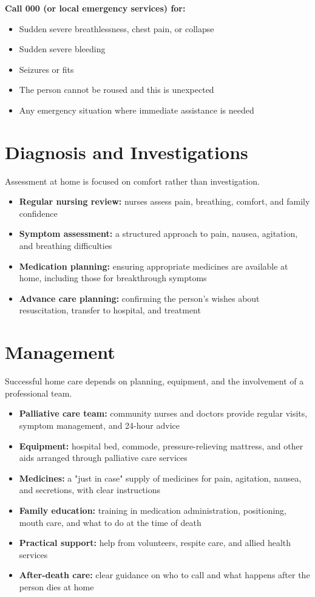 \textbf{Call 000 (or local emergency services) for:}
\begin{itemize}
    \item Sudden severe breathlessness, chest pain, or collapse
    \item Sudden severe bleeding
    \item Seizures or fits
    \item The person cannot be roused and this is unexpected
    \item Any emergency situation where immediate assistance is needed
\end{itemize}

\section*{Diagnosis and Investigations}
Assessment at home is focused on comfort rather than investigation.
\begin{itemize}
    \item \textbf{Regular nursing review:} nurses assess pain, breathing, comfort, and family confidence
    \item \textbf{Symptom assessment:} a structured approach to pain, nausea, agitation, and breathing difficulties
    \item \textbf{Medication planning:} ensuring appropriate medicines are available at home, including those for breakthrough symptoms
    \item \textbf{Advance care planning:} confirming the person's wishes about resuscitation, transfer to hospital, and treatment
\end{itemize}

\section*{Management}
Successful home care depends on planning, equipment, and the involvement of a professional team.
\begin{itemize}
    \item \textbf{Palliative care team:} community nurses and doctors provide regular visits, symptom management, and 24-hour advice
    \item \textbf{Equipment:} hospital bed, commode, pressure-relieving mattress, and other aids arranged through palliative care services
    \item \textbf{Medicines:} a "just in case" supply of medicines for pain, agitation, nausea, and secretions, with clear instructions
    \item \textbf{Family education:} training in medication administration, positioning, mouth care, and what to do at the time of death
    \item \textbf{Practical support:} help from volunteers, respite care, and allied health services
    \item \textbf{After-death care:} clear guidance on who to call and what happens after the person dies at home
\end{itemize}

